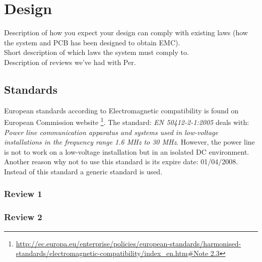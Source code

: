 \chapter{Design}
Description of how you expect your design can comply with existing laws (how the system and PCB has been designed to obtain EMC).
\\ Short description of which laws the system must comply to. 
\\ Description of reviews we've had with Per. 
\section{Standards}
European standards according to Electromagnetic compatibility is found on European Commission website \footnote{\url{http://ec.europa.eu/enterprise/policies/european-standards/harmonised-standards/electromagnetic-compatibility/index\_en.htm\#Note 2.3}}. 
The standard: \textit{EN 50412-2-1:2005} deals with: \textit{Power line communication apparatus and systems used in low-voltage installations in the frequency range 1.6 MHz to 30 MHz}. However, the power line is not to work on a low-voltage installation but in an isolated DC environment. Another reason why not to use this standard is its expire date: 01/04/2008. Instead of this standard a generic standard is used.


\subsection{Review 1}
\subsection{Review 2}